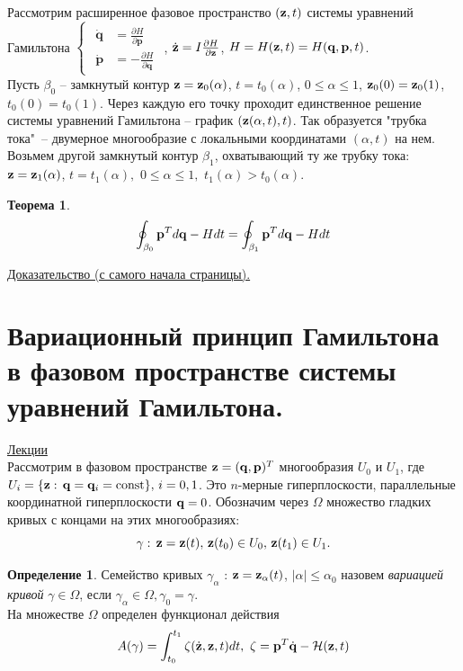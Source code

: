 \documentclass[specialist, subf, href, colorlinks=true, 12pt, times, mtpro, final]{disser}
\theoremstyle{definition}
\newtheorem{defn}{Определение}[section]
\newtheorem{theorem}{Теорема}[section]
\def\const{\text{const}}
\begin{document}
    Рассмотрим расширенное фазовое пространство $(\mathbf{z}, t)$ системы уравнений Гамильтона $\begin{cases}
   			\begin{matrix}
				\dot{\mathbf{q}} &= \frac{\partial H}{\partial \mathbf{p}}\\
				\dot{\mathbf{p}} &= -\frac{\partial H}{\partial \mathbf{q}}
			\end{matrix}
		\end{cases}$, $\dot{\mathbf{z}} = I\frac{\partial H}{\partial \mathbf{z}}$, $H = H(\mathbf{z},t)=H(\mathbf{q},\mathbf{p},t)$.\\
		Пусть $\beta_0$ -- замкнутый контур $\mathbf{z} = \mathbf{z}_0(\alpha)$, $t = t_0(\alpha)$, $0\leq \alpha \leq 1$, $\mathbf{z}_0(0)=\mathbf{z}_0(1)$, $t_0(0) = t_0(1)$. Через каждую его точку проходит единственное решение системы уравнений Гамильтона -- график $(\mathbf{z}(\alpha, t),t)$. Так образуется "трубка тока"\ -- двумерное многообразие с локальными координатами $(\alpha, t)$ на нем. Возьмем другой замкнутый контур $\beta_1$, охватывающий ту же трубку тока: $\mathbf{z} = \mathbf{z}_1(\alpha)$, $t = t_1(\alpha),$ $0\leq \alpha \leq 1,$ $t_1(\alpha) > t_0(\alpha)$.
		\begin{theorem}
			$$\oint_{\beta_0} \mathbf{p}^T d\mathbf{q} - Hdt = \oint_{\beta_1} \mathbf{p}^T d\mathbf{q} - Hdt$$
		\end{theorem}
    \hyperlink{lects.43}{Доказательство (с самого начала страницы).}
    
    \section{Вариационный принцип Гамильтона в фазовом пространстве системы уравнений Гамильтона.}
     \label{24}
    \hyperlink {lects.44}{Лекции}\\
    Рассмотрим в фазовом пространстве $\mathbf{z} = (\mathbf{q},\mathbf{p})^T$ многообразия $U_0$ и $U_1$,
    где $U_i = \{\bfz:\, \bfq=\bfq_i=\const\},\,i=0,1$. Это $n$-мерные гиперплоскости,
    параллельные координатной гиперплоскости $\mathbf{q} = 0$. Обозначим через $\Omega$ множество
    гладких кривых с концами на этих многообразиях: $$\gamma:\, \mathbf{z}=\mathbf{z}(t),\, \mathbf{z}(t_0)\in U_0,\, \mathbf{z}(t_1)\in U_1.$$
    \begin{defn}
    Семейство кривых $\gamma_\alpha$ : $\mathbf{z} = \mathbf{z}_\alpha(t)$, $|\alpha| \leq \alpha_0$ назовем {\it вариацией кривой} $\gamma \in \Omega$, если  $\gamma_\alpha \in \Omega, \gamma_0 = \gamma$. \\
    На множестве $\Omega$ определен функционал действия 
    $$
    A(\gamma) = \int^{t_1}_{t_0} \zeta (\dot{\mathbf{z}}, \mathbf{z}, t)dt,\,\, \zeta = \mathbf{p}^T\dot{\mathbf{q}} - \mathcal{H}(\mathbf{z}, t)
    $$
    \end{defn}
    
\end{document}
